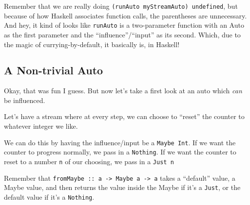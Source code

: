 \documentclass[]{article}
\newenvironment{Shaded}{}{}
\newcommand{\CommentTok}[1]{\textcolor[rgb]{0.38,0.63,0.69}{\textit{#1}}}
\newcommand{\DataTypeTok}[1]{\textcolor[rgb]{0.56,0.13,0.00}{#1}}
\newcommand{\DecValTok}[1]{\textcolor[rgb]{0.25,0.63,0.44}{#1}}
\newcommand{\KeywordTok}[1]{\textcolor[rgb]{0.00,0.44,0.13}{\textbf{#1}}}
\newcommand{\NormalTok}[1]{#1}
\newcommand{\OperatorTok}[1]{\textcolor[rgb]{0.40,0.40,0.40}{#1}}
\newcommand{\OtherTok}[1]{\textcolor[rgb]{0.00,0.44,0.13}{#1}}
\begin{document}
Remember that we are really doing \texttt{(runAuto\ myStreamAuto)\ undefined},
but because of how Haskell associates function calls, the parentheses are
unnecessary. And hey, it kind of looks like \texttt{runAuto} is a two-parameter
function with an Auto as the first parameter and the ``influence''/``input'' as
its second. Which, due to the magic of currying-by-default, it basically is, in
Haskell!

\subsection{A Non-trivial Auto}\label{a-non-trivial-auto}

Okay, that was fun I guess. But now let's take a first look at an auto which
\emph{can} be influenced.

Let's have a stream where at every step, we can choose to ``reset'' the counter
to whatever integer we like.

We can do this by having the influence/input be a \texttt{Maybe\ Int}. If we
want the counter to progress normally, we pass in a \texttt{Nothing}. If we want
the counter to reset to a number \texttt{n} of our choosing, we pass in a
\texttt{Just\ n}

\begin{Shaded}
\end{Shaded}

Remember that
\texttt{fromMaybe\ ::\ a\ -\textgreater{}\ Maybe\ a\ -\textgreater{}\ a} takes a
``default'' value, a Maybe value, and then returns the value inside the Maybe if
it's a \texttt{Just}, or the default value if it's a \texttt{Nothing}.
\end{document}
